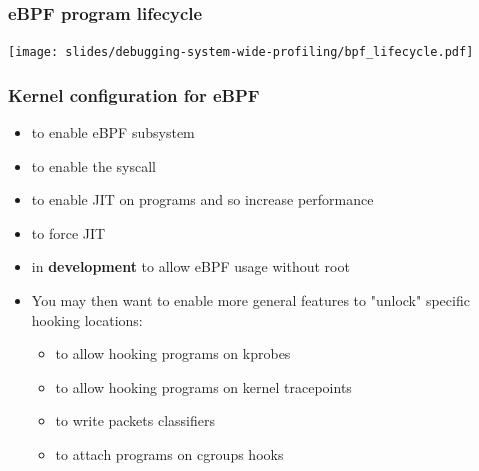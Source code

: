 \begin{frame}
  \frametitle{eBPF program lifecycle}
  \begin{center}
    \texttt{[image: slides/debugging-system-wide-profiling/bpf\_lifecycle.pdf]}
  \end{center}
\end{frame}

\begin{frame}[fragile]
  \frametitle{Kernel configuration for eBPF}
  \begin{itemize}
    \item {} to enable eBPF subsystem
    \item {} to enable the  syscall
    \item {} to enable JIT on programs and so increase performance
    \item {} to force JIT
    \item {} in \textbf{development} to
    allow eBPF usage without root
    \item You may then want to enable more general features to "unlock"
    specific hooking locations:
    \begin{itemize}
      \item {} to allow hooking programs on kprobes
      \item {} to allow hooking programs on kernel tracepoints
      \item {} to write packets classifiers
      \item {} to attach programs on cgroups hooks
    \end{itemize}
  \end{itemize}
\end{frame}

